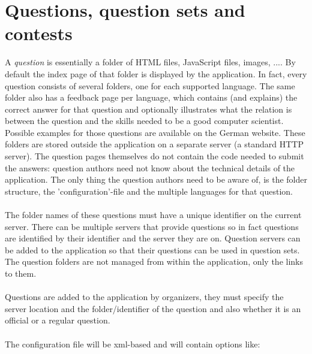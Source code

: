 \section{Questions, question sets and contests}

	A \emph{question} is essentially a folder of HTML files, JavaScript files, images, ....
	By default the index page of that folder is displayed by the application. In fact,
	every question consists of several folders, one for each supported language. The same
	folder also has a feedback page per language, which contains (and explains) the
	correct answer for that question and optionally illustrates what the relation is
	between the question and the skills needed to be a good computer scientist.
	Possible examples for those questions are available on the German website.
	These folders are stored outside the application on a separate server (a standard
	HTTP server). The question pages themselves do not contain the code needed to submit
	the answers: question authors need not know about the technical details of the
	application. The only thing the question authors need to be aware of, is the folder
	structure, the 'configuration'-file and the multiple languages for that question. \\
	\\
	The folder names of these questions must have a unique identifier on the current
	server. There can be multiple servers that provide questions so in fact questions
	are identified by their identifier and the server they are on. Question servers can be
	added to the application so that their questions can be used in question sets. The
	question folders are not managed from within the application, only the links to them.
	\\
	\\
	Questions are added to the application by organizers, they must specify the server
	location and the folder/identifier of the question and also whether it is an official
	or a regular question. 
	\\
	\\
	The configuration file will be xml-based and will contain options like:
